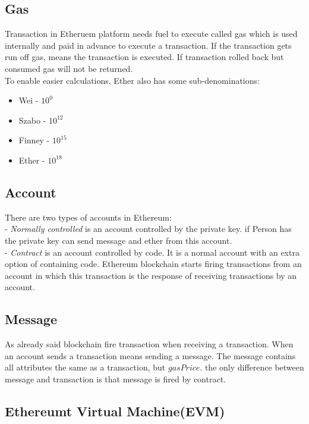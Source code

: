 \subsection{Gas} Transaction in Etheruem platform needs fuel to execute called gas which is used internally and paid in advance to execute a transaction. If the transaction gets run off gas, means the transaction is executed. If transaction rolled back but consumed gas will not be returned.\\
To enable easier calculations, Ether also has some sub-denominations\cite{Egbertsen}:\\
\begin{itemize}
	\item Wei - $10^0$
	\item Szabo - $10^12$
	\item Finney - $10^15$
	\item Ether - $10^18$
\end{itemize}
\subsection{Account}
There are two types of accounts in Ethereum:\\
- \textit{Normally controlled} is an account controlled
by the private key. if Person has the private key can send message and ether from this account.\\
- \textit{Contract} is an account controlled by code. It is a normal account with an extra option of containing code. Ethereum blockchain starts firing transactions from an account in which this transaction is the response of receiving transactions by an account\cite{Egbertsen}.
\subsection{Message} As already said blockchain fire transaction when receiving a transaction. When an account sends a transaction means sending a message. The message contains all attributes the same as a transaction, but $gasPrice$. the only difference between message and transaction is that message is fired by contract\cite{Egbertsen}.
\subsection{Ethereumt Virtual Machine(EVM)}

